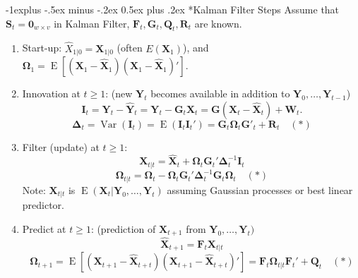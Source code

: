 \documentclass[paper=a4,fontsize=2.89mm]{scrartcl}
\makeatletter
\DeclareMathOperator{\Var}{Var}
\DeclareMathOperator{\E}{E}
\renewcommand{\subsection}{\@startsection{subsection}{2}{0mm}%
                                {-1explus -.5ex minus -.2ex}%
                                {0.5ex plus .2ex}%
                                {\normalfont\normalsize\bfseries}}
\makeatother
\begin{document}
\begin{multicols}{3}
\subsection*{Kalman Filter Steps}
Assume that $\mathbf{S}_t = \mathbf{0}_{w\times v}$ in Kalman Filter, $\mathbf{F}_t, \mathbf{G}_t, \mathbf{Q}_t,\mathbf{R}_t$ are known.
\begin{enumerate}
\item Start-up: $\hat{X}_{1|0} = \mathbf{X}_{1|0}$ (often $E(\mathbf{X}_1)$), and $\boldsymbol{\Omega}_1 = \E\left[ (\mathbf{X}_1 - \hat{\mathbf{X}}_{1}) (\mathbf{X}_1 - \hat{\mathbf{X}}_{1}) '\right].$
\item Innovation at $t\ge1$: (new $\mathbf{Y}_t$ becomes available in addition to $\mathbf{Y}_0, \dots, \mathbf{Y}_{t-1}$)
$$\mathbf{I}_t = \mathbf{Y}_t - \hat{\mathbf{Y}}_t = \mathbf{Y}_t - \mathbf{G}_t\hat{\mathbf{X}}_t = \mathbf{G}(\mathbf{X}_t-\hat{\mathbf{X}}_t) + \mathbf{W}_t.$$
$$\boldsymbol{\Delta}_t = \Var(\mathbf{I}_t) = \E(\mathbf{I}_t\mathbf{I}_t') = \mathbf{G}_t\boldsymbol{\Omega}_t\mathbf{G}'_t + \mathbf{R}_t \quad (\ast)$$
\item Filter (update) at $t\ge1$:
$$\mathbf{X}_{t|t} = \hat{\mathbf{X}}_t + \boldsymbol{\Omega}_t\mathbf{G}_t'\boldsymbol{\Delta}_t^{-1}\mathbf{I}_t$$
$$\boldsymbol{\Omega}_{t|t} = \boldsymbol{\Omega}_{t} - \boldsymbol{\Omega}_{t}\mathbf{G}_t'\boldsymbol{\Delta}_t^{-1}\mathbf{G}_t\boldsymbol{\Omega}_{t} \quad (\ast)$$
Note: $\mathbf{X}_{t|t}$ is $\E(\mathbf{X}_t|\mathbf{Y}_0,\dots,\mathbf{Y}_{t})$ assuming Gaussian processes or best linear predictor.
\item Predict at $t\ge1$: (prediction of $\mathbf{X}_{t+1}$ from $\mathbf{Y}_0,\dots,\mathbf{Y}_{t})$
$$\hat{\mathbf{X}}_{t+1} = \mathbf{F}_t\mathbf{X}_{t|t}$$
$$\boldsymbol{\Omega}_{t+1} = \E\left[ (\mathbf{X}_{t+1} - \hat{\mathbf{X}}_{t+t}) (\mathbf{X}_{t+1} - \hat{\mathbf{X}}_{t+t})'\right] = \mathbf{F}_t\boldsymbol{\Omega}_{t|t}\mathbf{F}_t' +\mathbf{Q}_t\quad (\ast)$$
\end{enumerate}





























\end{multicols}
\end{document}

